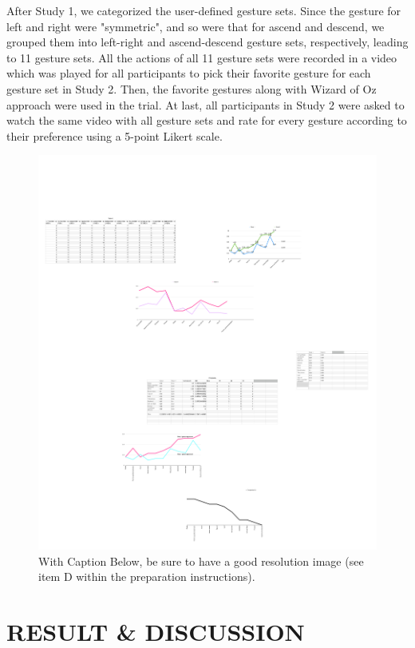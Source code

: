 \documentclass{sigchi}
\begin{document}
After Study 1, we categorized the user-defined gesture sets. Since the gesture for left and right were "symmetric", and so were that for ascend and descend, we grouped them into left-right and ascend-descend gesture sets, respectively, leading to 11 gesture sets. All the actions of all 11 gesture sets were recorded in a video which was played for all participants to pick their favorite gesture for each gesture set in Study 2. Then, the favorite gestures along with Wizard of Oz approach were used in the trial. At last, all participants in Study 2 were asked to watch the same video with all gesture sets and rate for every gesture according to their preference using a 5-point Likert scale.

\begin{figure}[!h]
\centering
\includegraphics[width=1\columnwidth]{agreement.pdf}
\caption{With Caption Below, be sure to have a good resolution image
  (see item D within the preparation instructions).}
\label{fig:figure1}
\end{figure}

\section{RESULT \& DISCUSSION}
\end{document}

